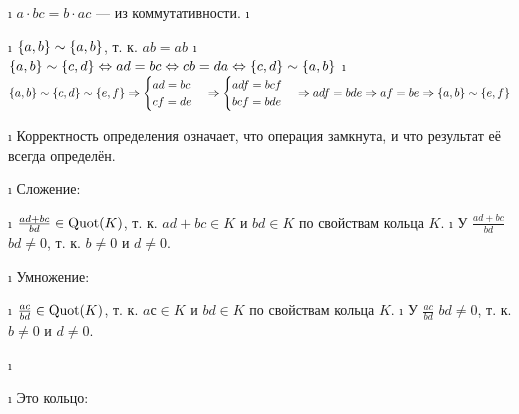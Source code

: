 \begin{solution}

\begin{enumerate}
\def\labelenumi{\alph{enumi})}
\i
  \(a \cdot bc = b \cdot ac\) --- из коммутативности.
\i
  \begin{itemize}
  \tightlist
  \i
    \(\{a, b\} \~ \{a, b\}\), т. к. \(ab=ab\)
  \i
    \(\{a, b\} \~ \{c, d\} \Iff ad=bc \Iff cb=da \Iff \{c, d\} \~ \{a, b\}\)
  \i
    \(\{a, b\} \~ \{c, d\} \~ \{e, f\} \Then \begin{cases} ad=bc\\cf=de\end{cases} \Then \begin{cases} adf=bcf\\bcf=bde\end{cases} \Then adf=bde \Then af=be \Then \{a, b\} \~ \{e, f\}\)
  \end{itemize}
\i
  Корректность определения означает, что операция замкнута, и что результат её всегда определён.

  \begin{itemize}
  \tightlist
  \i
    Сложение:

    \begin{itemize}
    \tightlist
    \i
      \(\frac{ad+bc}{bd} \in \Quot(K)\), т. к. \(ad+bc \in K\) и \(bd \in K\) по свойствам кольца \(K\).
    \i
      У \(\frac{ad+bc}{bd}\) \(bd \ne 0\), т. к. \(b \ne 0\) и \(d \ne 0\).
    \end{itemize}
  \i
    Умножение:

    \begin{itemize}
    \tightlist
    \i
      \(\frac{ac}{bd} \in \Quot(K)\), т. к. \(aс \in K\) и \(bd \in K\) по свойствам кольца \(K\).
    \i
      У \(\frac{ac}{bd}\) \(bd \ne 0\), т. к. \(b \ne 0\) и \(d \ne 0\).
    \end{itemize}
  \end{itemize}
\i
  \begin{itemize}
  \tightlist
  \i
    Это кольцо:


\end{itemize}
\end{enumerate}
\end{solution}
